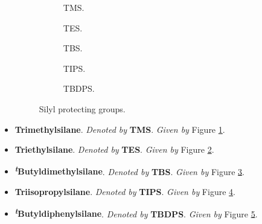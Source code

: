 \documentclass[../notes.tex]{subfiles}
\begin{document}
\begin{itemize}
    \begin{figure}[h!]
        \centering
        \footnotesize
        \begin{subfigure}[b]{0.17\linewidth}
            \centering
            \caption{TMS.}
            \label{fig:silylPGa}
        \end{subfigure}
        \begin{subfigure}[b]{0.17\linewidth}
            \centering
            \caption{TES.}
            \label{fig:silylPGb}
        \end{subfigure}
        \begin{subfigure}[b]{0.17\linewidth}
            \centering
            \caption{TBS.}
            \label{fig:silylPGc}
        \end{subfigure}
        \begin{subfigure}[b]{0.17\linewidth}
            \centering
            \caption{TIPS.}
            \label{fig:silylPGd}
        \end{subfigure}
        \begin{subfigure}[b]{0.17\linewidth}
            \centering
            \caption{TBDPS.}
            \label{fig:silylPGe}
        \end{subfigure}
        \caption{Silyl protecting groups.}
        \label{fig:silylPG}
    \end{figure}
    \item \textbf{Trimethylsilane}. \emph{Denoted by} \textbf{TMS}. \emph{Given by} Figure \ref{fig:silylPGa}.
    \item \textbf{Triethylsilane}. \emph{Denoted by} \textbf{TES}. \emph{Given by} Figure \ref{fig:silylPGb}.
    \item \textbf{\textsuperscript{\emph{t}}Butyldimethylsilane}. \emph{Denoted by} \textbf{TBS}. \emph{Given by} Figure \ref{fig:silylPGc}.
    \item \textbf{Triisopropylsilane}. \emph{Denoted by} \textbf{TIPS}. \emph{Given by} Figure \ref{fig:silylPGd}.
    \item \textbf{\textsuperscript{\emph{t}}Butyldiphenylsilane}. \emph{Denoted by} \textbf{TBDPS}. \emph{Given by} Figure \ref{fig:silylPGe}.

\end{itemize}
\end{document}
